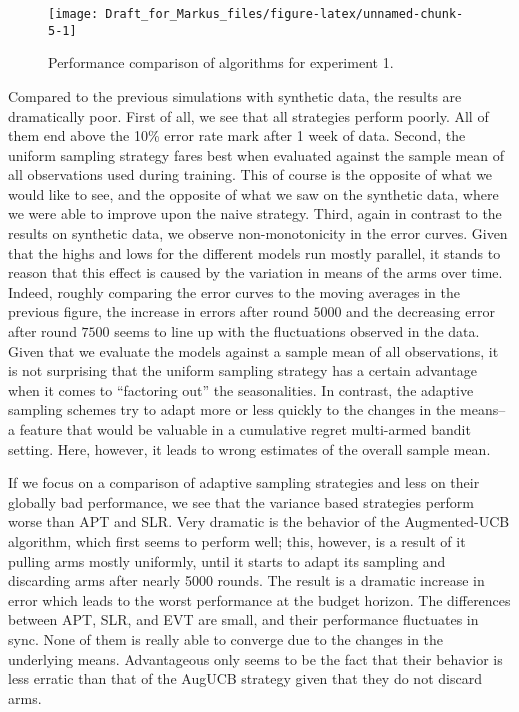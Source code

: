 \documentclass[11pt,]{article}
\begin{document}
\begin{figure}

{\centering \texttt{[image: Draft\_for\_Markus\_files/figure-latex/unnamed-chunk-5-1]} 

}

\caption{Performance comparison of algorithms for experiment 1.}\label{fig:unnamed-chunk-5}
\end{figure}

Compared to the previous simulations with synthetic data, the results
are dramatically poor. First of all, we see that all strategies perform
poorly. All of them end above the 10\% error rate mark after 1 week of
data. Second, the uniform sampling strategy fares best when evaluated
against the sample mean of all observations used during training. This
of course is the opposite of what we would like to see, and the opposite
of what we saw on the synthetic data, where we were able to improve upon
the naive strategy. Third, again in contrast to the results on synthetic
data, we observe non-monotonicity in the error curves. Given that the
highs and lows for the different models run mostly parallel, it stands
to reason that this effect is caused by the variation in means of the
arms over time. Indeed, roughly comparing the error curves to the moving
averages in the previous figure, the increase in errors after round
\(5000\) and the decreasing error after round \(7500\) seems to line up
with the fluctuations observed in the data. Given that we evaluate the
models against a sample mean of all observations, it is not surprising
that the uniform sampling strategy has a certain advantage when it comes
to ``factoring out'' the seasonalities. In contrast, the adaptive
sampling schemes try to adapt more or less quickly to the changes in the
means--a feature that would be valuable in a cumulative regret
multi-armed bandit setting. Here, however, it leads to wrong estimates
of the overall sample mean.

If we focus on a comparison of adaptive sampling strategies and less on
their globally bad performance, we see that the variance based
strategies perform worse than APT and SLR. Very dramatic is the behavior
of the Augmented-UCB algorithm, which first seems to perform well; this,
however, is a result of it pulling arms mostly uniformly, until it
starts to adapt its sampling and discarding arms after nearly 5000
rounds. The result is a dramatic increase in error which leads to the
worst performance at the budget horizon. The differences between APT,
SLR, and EVT are small, and their performance fluctuates in sync. None
of them is really able to converge due to the changes in the underlying
means. Advantageous only seems to be the fact that their behavior is
less erratic than that of the AugUCB strategy given that they do not
discard arms.
\end{document}
